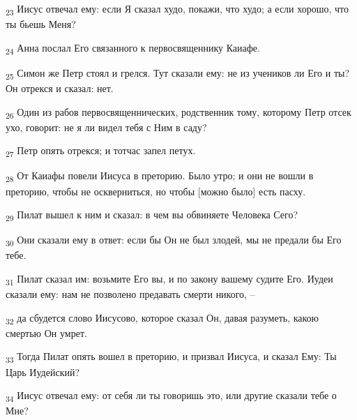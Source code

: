 \begin{tcolorbox}
\textsubscript{23} Иисус отвечал ему: если Я сказал худо, покажи, что худо; а если хорошо, что ты бьешь Меня?
\end{tcolorbox}
\begin{tcolorbox}
\textsubscript{24} Анна послал Его связанного к первосвященнику Каиафе.
\end{tcolorbox}
\begin{tcolorbox}
\textsubscript{25} Симон же Петр стоял и грелся. Тут сказали ему: не из учеников ли Его и ты? Он отрекся и сказал: нет.
\end{tcolorbox}
\begin{tcolorbox}
\textsubscript{26} Один из рабов первосвященнических, родственник тому, которому Петр отсек ухо, говорит: не я ли видел тебя с Ним в саду?
\end{tcolorbox}
\begin{tcolorbox}
\textsubscript{27} Петр опять отрекся; и тотчас запел петух.
\end{tcolorbox}
\begin{tcolorbox}
\textsubscript{28} От Каиафы повели Иисуса в преторию. Было утро; и они не вошли в преторию, чтобы не оскверниться, но чтобы [можно было] есть пасху.
\end{tcolorbox}
\begin{tcolorbox}
\textsubscript{29} Пилат вышел к ним и сказал: в чем вы обвиняете Человека Сего?
\end{tcolorbox}
\begin{tcolorbox}
\textsubscript{30} Они сказали ему в ответ: если бы Он не был злодей, мы не предали бы Его тебе.
\end{tcolorbox}
\begin{tcolorbox}
\textsubscript{31} Пилат сказал им: возьмите Его вы, и по закону вашему судите Его. Иудеи сказали ему: нам не позволено предавать смерти никого, --
\end{tcolorbox}
\begin{tcolorbox}
\textsubscript{32} да сбудется слово Иисусово, которое сказал Он, давая разуметь, какою смертью Он умрет.
\end{tcolorbox}
\begin{tcolorbox}
\textsubscript{33} Тогда Пилат опять вошел в преторию, и призвал Иисуса, и сказал Ему: Ты Царь Иудейский?
\end{tcolorbox}
\begin{tcolorbox}
\textsubscript{34} Иисус отвечал ему: от себя ли ты говоришь это, или другие сказали тебе о Мне?
\end{tcolorbox}

